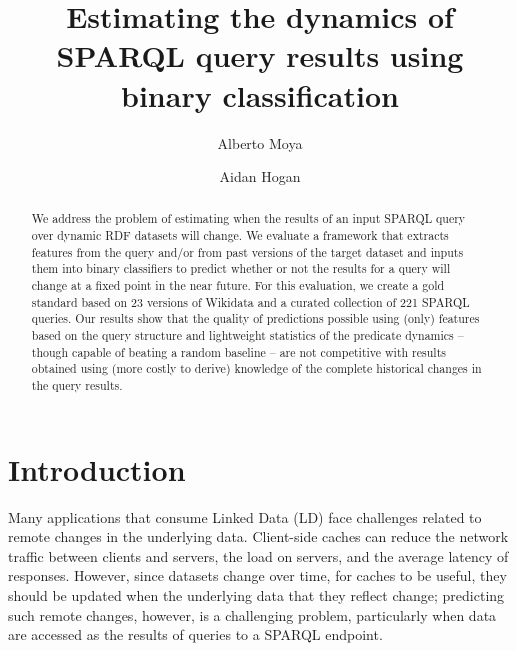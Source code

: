 \documentclass[runningheads]{llncs}
\begin{document}
%
\title{Estimating the dynamics of SPARQL query results using binary classification
}
%
%
\author{Alberto Moya \and Aidan Hogan}
%
%
%
\maketitle              %
%
\begin{abstract}
We address the problem of estimating when the results of an input SPARQL query over dynamic RDF datasets will change. We evaluate a framework that extracts features from the query and/or from past versions of the target dataset and inputs them into binary classifiers to predict whether or not the results for a query will change at a fixed point in the near future. For this evaluation, we create a gold standard based on 23 versions of Wikidata and a curated collection of 221 SPARQL queries. Our results show that the quality of predictions possible using (only) features based on the query structure and lightweight statistics of the predicate dynamics -- though capable of beating a random baseline -- are not competitive with results obtained using (more costly to derive) knowledge of the complete historical changes in the query results.

\end{abstract}
%
%
\section{Introduction}
\label{sec:intro}
%
Many applications that consume Linked Data (LD) face challenges related to remote changes in the underlying data. Client-side caches can reduce the network traffic between clients and servers, the load on servers, and the average latency of responses. However, since datasets change over time, for caches to be useful, they should be updated when the underlying data that they reflect change; predicting such remote changes, however, is a challenging problem, particularly when data are accessed as the results of queries to a SPARQL endpoint.
\end{document}
